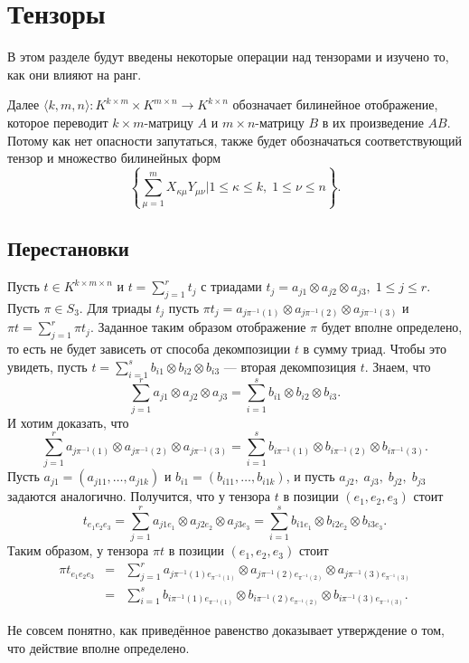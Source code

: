 \section{Тензоры}

В этом разделе будут введены некоторые операции над тензорами и изучено то, как они влияют на ранг.

Далее $\langle k,m,n \rangle:K^{k \times m} \times K^{m \times n} \to K^{k \times n}$ обозначает билинейное отображение, которое переводит $k \times m$-матрицу $A$ и $m \times n$-матрицу $B$ в их произведение $AB$. Потому как нет опасности запутаться, также будет обозначаться соответствующий тензор и множество билинейных форм
\[
	\left\{ \sum\limits_{\mu=1}^{m} X_{\kappa \mu} Y_{\mu \nu}| 1 \leq \kappa \leq k,\; 1 \leq \nu \leq n \right\}.
\]

\subsection{Перестановки}

Пусть $t \in K^{k \times m \times n}$ и $t = \sum_{j=1}^{r} t_j$ с триадами $t_j = a_{j1} \otimes a_{j2} \otimes a_{j3}, \; 1 \leq j \leq r $. Пусть $\pi \in S_3$. Для триады $t_j$ пусть $\pi t_j = a_{j \pi^{-1}(1)} \otimes a_{j \pi^{-1}(2)} \otimes a_{j \pi^{-1}(3)}$ и $\pi t = \sum_{j=1}^{r} \pi t_j$. Заданное таким образом отображение $\pi$ будет вполне определено, то есть не будет зависеть от способа декомпозиции $t$ в сумму триад. Чтобы это увидеть, пусть $t = \sum_{i=1}^{s} b_{i1} \otimes b_{i2} \otimes b_{i3}$ --- вторая декомпозиция $t$. Знаем, что
\[
	\sum_{j=1}^{r} a_{j1} \otimes a_{j2} \otimes a_{j3} = \sum_{i=1}^{s} b_{i1} \otimes b_{i2} \otimes b_{i3}.
\]
И хотим доказать, что
\[
	\sum_{j=1}^{r} a_{j \pi^{-1}(1)} \otimes a_{j \pi^{-1}(2)} \otimes a_{j \pi^{-1}(3)} = \sum_{i=1}^{s} b_{i \pi^{-1}(1)} \otimes b_{i \pi^{-1}(2)} \otimes b_{i \pi^{-1}(3)}.
\]
Пусть $a_{j1} = \left( a_{j11}, \dotsc, a_{j1k} \right)$ и $b_{i1} = \left( b_{i11}, \dotsc, b_{i1k} \right)$, и пусть $a_{j2}, \; a_{j3}, \; b_{j2}, \; b_{j3}$ задаются аналогично.
Получится, что у тензора $t$ в позиции $\left( e_1,e_2,e_3 \right)$ стоит
\[
	t_{e_1e_2e_3} = \sum\limits_{j=1}^{r} a_{j1e_1} \otimes a_{j2e_2} \otimes a_{j3e_3} = \sum\limits_{i=1}^{s} b_{i1e_1} \otimes b_{i2e_2} \otimes b_{i3e_3}.
\]
Таким образом, у тензора $\pi t$ в позиции $(e_1, e_2, e_3)$ стоит
\[
	\begin{array}{rcl}
	  \pi t_{e_1e_2e_3} & = & \sum\limits_{j=1}^{r} a_{j \pi^{-1}(1) e_{\pi^{-1}(1)}} \otimes a_{j \pi^{-1}(2) e_{\pi^{-1}(2)}} \otimes a_{j \pi^{-1}(3) e_{\pi^{-1}(3)}}\\
	  & = & \sum\limits_{i=1}^{s} b_{i \pi^{-1}(1) e_{\pi^{-1}(1)}} \otimes b_{i \pi^{-1}(2) e_{\pi^{-1}(2)}} \otimes b_{i \pi^{-1}(3) e_{\pi^{-1}(3)}}.
	\end{array}
\]
\begin{question}
  Не совсем понятно, как приведённое равенство доказывает утверждение о том, что действие вполне определено. 
\end{question}

